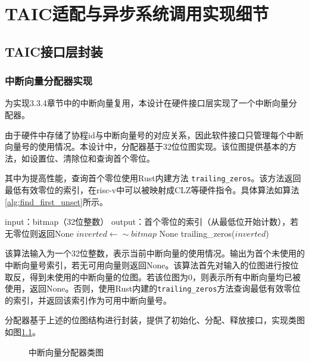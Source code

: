 \chapter{TAIC适配与异步系统调用实现细节}


\section{TAIC接口层封装}

\subsection{中断向量分配器实现}

为实现3.3.4章节中的中断向量复用，本设计在硬件接口层实现了一个中断向量分配器。

由于硬件中存储了协程id与中断向量号的对应关系，因此软件接口只管理每个中断向量号的使用情况。本设计中，分配器基于32位位图实现。该位图提供基本的方法，如设置位、清除位和查询首个零位。

其中为提高性能，查询首个零位使用Rust内建方法 \verb|trailing_zeros|\cite{Lin2019RustRiscvSIMD}。该方法返回最低有效零位的索引，在risc-v中可以被映射成CLZ等硬件指令\cite{Waterman2014RISCVISA}。具体算法如算法\ref{alg:find_first_unset}所示。


\begin{algorithm}
  \caption{查找位图中首个零位}
  \label{alg:find_first_unset}
  \begin{algorithmic}
    \Require input：bitmap（32位整数）
    \Ensure output：首个零位的索引（从最低位开始计数），若无零位则返回None
    \State $inverted \gets \sim bitmap$
    \State \Return None
    \Else
    \State \Return trailing\_zeros($\textit{inverted}$)
    \EndIf
    \EndFunction
  \end{algorithmic}
\end{algorithm}

该算法输入为一个32位整数，表示当前中断向量的使用情况。输出为首个未使用的中断向量号索引，若无可用向量则返回None。该算法首先对输入的位图进行按位取反，得到未使用的中断向量的位图。若该位图为0，则表示所有中断向量均已被使用，返回None。否则，使用Rust内建的\verb|trailing_zeros|方法查询最低有效零位的索引，并返回该索引作为可用中断向量号。

分配器基于上述的位图结构进行封装，提供了初始化、分配、释放接口，实现类图如图\ref{中断向量分配器类图}。

\begin{figure}[htbp]
  \centering
  
  \caption{中断向量分配器类图}\label{中断向量分配器类图}
\end{figure}

